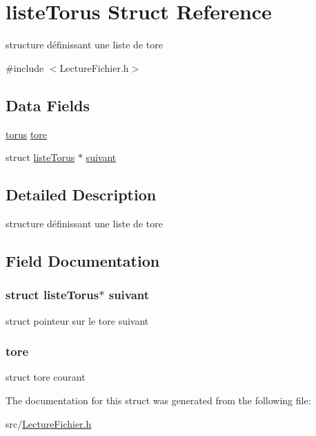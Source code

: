 \hypertarget{structliste_torus}{
\section{listeTorus Struct Reference}
\label{structliste_torus}
}


structure définissant une liste de tore  




{\ttfamily \#include $<$LectureFichier.h$>$}

\subsection*{Data Fields}
\begin{DoxyCompactItemize}
\item 
\hyperlink{structtorus}{torus} \hyperlink{structliste_torus_a557c6aba3fcd512af3b30630912bd5c9}{tore}
\item 
struct \hyperlink{structliste_torus}{listeTorus} $\ast$ \hyperlink{structliste_torus_acd969630641009521a2c73202534949d}{suivant}
\end{DoxyCompactItemize}


\subsection{Detailed Description}
structure définissant une liste de tore 

\subsection{Field Documentation}
\hypertarget{structliste_torus_acd969630641009521a2c73202534949d}{
\subsubsection[{suivant}]{\setlength{\rightskip}{0pt plus 5cm}struct {\bf listeTorus}$\ast$ {\bf suivant}}}
\label{structliste_torus_acd969630641009521a2c73202534949d}
struct pointeur sur le tore suivant \hypertarget{structliste_torus_a557c6aba3fcd512af3b30630912bd5c9}{
\subsubsection[{tore}]{ {\bf tore}}}
\label{structliste_torus_a557c6aba3fcd512af3b30630912bd5c9}
struct tore courant 

The documentation for this struct was generated from the following file:\begin{DoxyCompactItemize}
\item 
src/\hyperlink{_lecture_fichier_8h}{LectureFichier.h}\end{DoxyCompactItemize}
